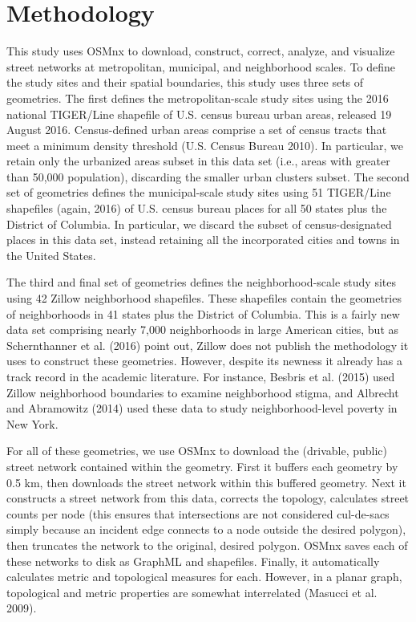 \documentclass[Afour,sageh,times]{sage/sagej}
\begin{document}
\section{Methodology}
This study uses OSMnx to download, construct, correct, analyze, and visualize street networks at metropolitan, municipal, and neighborhood scales. To define the study sites and their spatial boundaries, this study uses three sets of geometries. The first defines the metropolitan-scale study sites using the 2016 national TIGER/Line shapefile of U.S. census bureau urban areas, released 19 August 2016. Census-defined urban areas comprise a set of census tracts that meet a minimum density threshold (U.S. Census Bureau 2010). In particular, we retain only the urbanized areas subset in this data set (i.e., areas with greater than 50,000 population), discarding the smaller urban clusters subset. The second set of geometries defines the municipal-scale study sites using 51 TIGER/Line shapefiles (again, 2016) of U.S. census bureau places for all 50 states plus the District of Columbia. In particular, we discard the subset of census-designated places in this data set, instead retaining all the incorporated cities and towns in the United States. 

The third and final set of geometries defines the neighborhood-scale study sites using 42 Zillow neighborhood shapefiles. These shapefiles contain the geometries of neighborhoods in 41 states plus the District of Columbia. This is a fairly new data set comprising nearly 7,000 neighborhoods in large American cities, but as Schernthanner et al. (2016) point out, Zillow does not publish the methodology it uses to construct these geometries. However, despite its newness it already has a track record in the academic literature. For instance, Besbris et al. (2015) used Zillow neighborhood boundaries to examine neighborhood stigma, and Albrecht and Abramowitz (2014) used these data to study neighborhood-level poverty in New York.

For all of these geometries, we use OSMnx to download the (drivable, public) street network contained within the geometry. First it buffers each geometry by 0.5 km, then downloads the street network within this buffered geometry. Next it constructs a street network from this data, corrects the topology, calculates street counts per node (this ensures that intersections are not considered cul-de-sacs simply because an incident edge connects to a node outside the desired polygon), then truncates the network to the original, desired polygon. OSMnx saves each of these networks to disk as GraphML and shapefiles. Finally, it automatically calculates metric and topological measures for each. However, in a planar graph, topological and metric properties are somewhat interrelated (Masucci et al. 2009).
\end{document}
